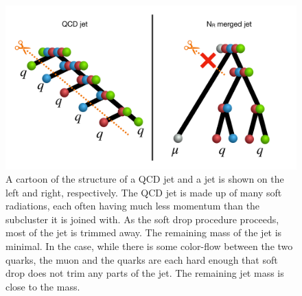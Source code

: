 \begin{figure}[!tp]
    \centering
    \includegraphics[width=\textwidth]{figures/JetSubstructureComparison.pdf}
    \caption[
        Jet Substructure Comparison
    ]    
    {
       A cartoon of the structure of a QCD jet and a \NR jet is shown on the left and right, respectively. The QCD jet is made up of many soft radiations, each often having much less momentum than the subcluster it is joined with. As the soft drop procedure proceeds, most of the jet is trimmed away. The remaining mass of the jet is minimal. In the \NR case, while there is some color-flow between the two quarks, the muon and the quarks are each hard enough that soft drop does not trim any parts of the jet. The remaining jet mass is close to the \NR mass.
    }
    \label{fig:softdropcartoon}
    
\end{figure}




